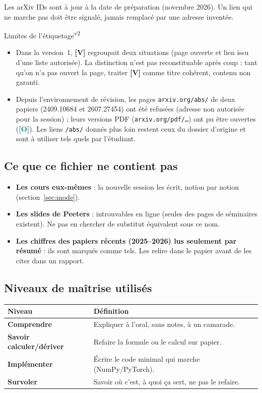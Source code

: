 \documentclass[11pt,a4paper]{article}
\providecommand{\og}{\guillemotleft\nobreakspace}%
\providecommand{\fg}{\nobreakspace\guillemotright}}
\newcommand{\lV}{\textbf{\textcolor{green!45!black}{[V]}}}
\newcommand{\lO}{\textbf{\textcolor{teal}{[O]}}}
\newcommand{\vtwot}{\textsuperscript{v2}}  %
\begin{document}
Les arXiv IDs sont à jour à la date de préparation (novembre 2026). Un lien qui ne marche pas doit être signalé, jamais remplacé par une adresse inventée.

\begin{corr}{Limites de l'étiquetage\vtwot}
\begin{itemize}
\item Dans la version~1, \lV{} regroupait deux situations (\og{}page ouverte\fg{} et \og{}lien issu d'une liste autorisée\fg{}). La distinction n'est pas reconstituable après coup : tant qu'on n'a pas ouvert la page, traiter \lV{} comme \og{}titre cohérent, contenu non garanti\fg{}.
\item Depuis l'environnement de révision, les pages \texttt{arxiv.org/abs/} de deux papiers (2409.10684 et 2607.27454) ont été refusées (adresse non autorisée pour la session) ; leurs versions PDF (\texttt{arxiv.org/pdf/\ldots}) ont pu être ouvertes (\lO). Les liens \texttt{/abs/} donnés plus loin restent ceux du dossier d'origine et sont à utiliser tels quels par l'étudiant.
\end{itemize}
\end{corr}

\subsection{Ce que ce fichier ne contient pas}
\begin{itemize}
\item \textbf{Les cours eux-mêmes} : la nouvelle session les écrit, notion par notion (section~\ref{sec:mode}).
\item \textbf{Les slides de Peeters} : introuvables en ligne (seules des pages de séminaires existent). Ne pas en chercher de substitut \og{}équivalent\fg{} sous ce nom.
\item \textbf{Les chiffres des papiers récents (2025--2026) lus seulement par résumé} : ils sont marqués comme tels. Les relire dans le papier avant de les citer dans un rapport.
\end{itemize}

\subsection{Niveaux de maîtrise utilisés}
{\small
\begin{longtable}{L{3.6cm}L{11.9cm}}
\toprule
\textbf{Niveau} & \textbf{Définition}\\
\midrule
\endhead
\bottomrule
\endfoot
\textbf{Comprendre} & Expliquer à l'oral, sans notes, à un camarade.\\
\textbf{Savoir calculer/dériver} & Refaire la formule ou le calcul sur papier.\\
\textbf{Implémenter} & Écrire le code minimal qui marche (NumPy/PyTorch).\\
\textbf{Survoler} & Savoir où c'est, à quoi ça sert, ne pas le refaire.\\
\end{longtable}}
\end{document}
